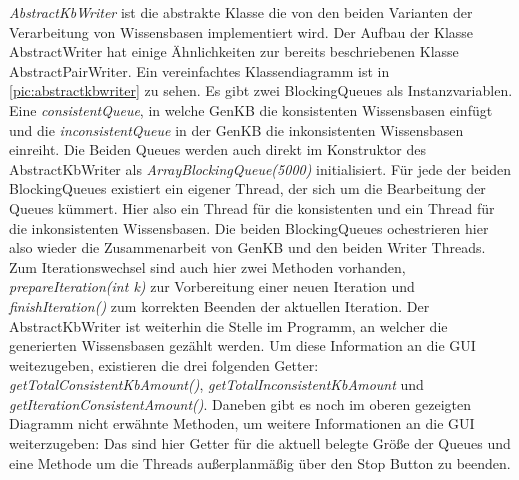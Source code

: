 \documentclass[12pt,a4paper]{article}
\begin{document}
\textit{AbstractKbWriter} ist die abstrakte Klasse die von den beiden Varianten der Verarbeitung von Wissensbasen implementiert wird. Der Aufbau der Klasse AbstractWriter hat einige Ähnlichkeiten zur bereits beschriebenen Klasse AbstractPairWriter. Ein vereinfachtes Klassendiagramm ist in \autoref{pic:abstractkbwriter} zu sehen. Es gibt zwei BlockingQueues als Instanzvariablen. Eine \textit{consistentQueue}, in welche GenKB die konsistenten Wissensbasen einfügt und die \textit{inconsistentQueue} in der GenKB die inkonsistenten Wissensbasen einreiht. Die Beiden Queues werden auch direkt im Konstruktor des AbstractKbWriter als \textit{ArrayBlockingQueue(5000)} initialisiert. Für jede der beiden BlockingQueues existiert ein eigener Thread, der sich um die Bearbeitung der Queues kümmert. Hier also ein Thread für die konsistenten und ein Thread für die inkonsistenten Wissensbasen. Die beiden BlockingQueues ochestrieren hier also wieder die Zusammenarbeit von GenKB und den beiden Writer Threads. Zum Iterationswechsel sind auch hier zwei Methoden vorhanden, \textit{prepareIteration(int k)} zur Vorbereitung einer neuen Iteration und \textit{finishIteration()} zum korrekten Beenden der aktuellen Iteration. Der AbstractKbWriter ist weiterhin die Stelle im Programm, an welcher die generierten Wissensbasen gezählt werden. Um diese Information an die GUI weitezugeben, existieren die drei folgenden Getter: \textit{getTotalConsistentKbAmount()}, \textit{getTotalInconsistentKbAmount} und \textit{getIterationConsistentAmount()}.
Daneben gibt es noch im  oberen gezeigten Diagramm nicht erwähnte Methoden, um weitere Informationen an die GUI weiterzugeben: Das sind hier Getter für die aktuell belegte Größe der Queues und eine Methode um die Threads außerplanmäßig über den Stop Button zu beenden.
\end{document}
